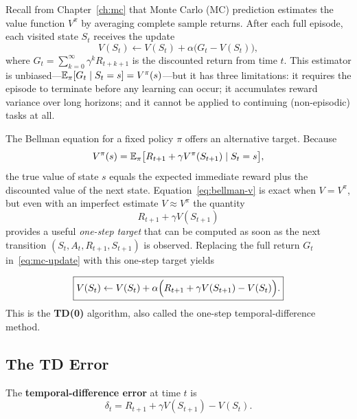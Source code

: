 Recall from Chapter~\ref{ch:mc} that Monte Carlo (MC) prediction estimates the value function $V^\pi$ by averaging complete sample returns.  After each full episode, each visited state $S_t$ receives the update
\begin{equation}
\label{eq:mc-update}
V(S_t) \leftarrow V(S_t) + \alpha\bigl(G_t - V(S_t)\bigr),
\end{equation}
where $G_t = \sum_{k=0}^{\infty}\gamma^k R_{t+k+1}$ is the discounted return from time $t$.  This estimator is unbiased---$\operatorname{\mathbb{E}}_\pi[G_t \mid S_t = s] = V^\pi(s)$---but it has three limitations: it requires the episode to terminate before any learning can occur; it accumulates reward variance over long horizons; and it cannot be applied to continuing (non-episodic) tasks at all.

The Bellman equation for a fixed policy $\pi$ offers an alternative target.  Because
\begin{equation}
\label{eq:bellman-v}
V^\pi(s) = \operatorname{\mathbb{E}}_\pi\bigl[R_{t+1} + \gamma V^\pi(S_{t+1}) \mid S_t = s\bigr],
\end{equation}
the true value of state $s$ equals the expected immediate reward plus the discounted value of the next state.  Equation~\eqref{eq:bellman-v} is exact when $V = V^\pi$, but even with an imperfect estimate $V \approx V^\pi$ the quantity
\begin{equation}
\label{eq:td0-target}
R_{t+1} + \gamma V(S_{t+1})
\end{equation}
provides a useful \emph{one-step target} that can be computed as soon as the next transition $(S_t, A_t, R_{t+1}, S_{t+1})$ is observed.  Replacing the full return $G_t$ in~\eqref{eq:mc-update} with this one-step target yields

\begin{equation}
\label{eq:td0-update}
\boxed{V(S_t) \leftarrow V(S_t) + \alpha\Bigl(R_{t+1} + \gamma V(S_{t+1}) - V(S_t)\Bigr).}
\end{equation}
This is the \textbf{TD(0)} algorithm, also called the one-step temporal-difference method.

\subsection{The TD Error}

\begin{definition}[TD error]
\label{def:td-error}
The \textbf{temporal-difference error} at time $t$ is
\begin{equation}
\label{eq:td-error}
\delta_t = R_{t+1} + \gamma V(S_{t+1}) - V(S_t).
\end{equation}
\end{definition}

